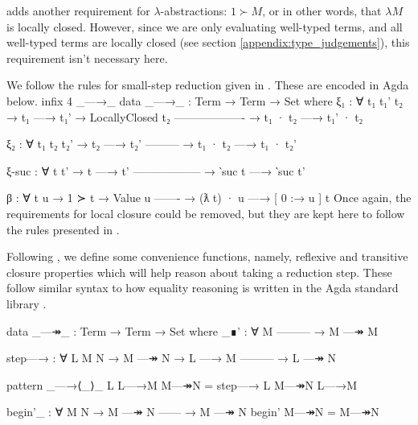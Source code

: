 \documentclass[logo,bsc,singlespacing,parskip,online]{infthesis}
\renewenvironment{code}{\mintedcopy[breaklines,breaksymbolleft=\;]{agda}}{\endmintedcopy}
\begin{document}
\citet{chargueraud_locally_2012} adds another requirement for $\lambda$-abstractions: $1 \succ M$,
or in other words, that $\lambda M$ is locally closed. However, since we are only evaluating
well-typed terms, and all well-typed terms are locally closed (see section
\ref{appendix:type_judgements}), this requirement isn't necessary here.

We follow the rules for small-step reduction given in \citet{chargueraud_locally_2012}. These are
encoded in Agda below.
\begin{code}
  infix 4 _—→_
  data _—→_ : Term → Term → Set where
    ξ₁ : ∀ {t₁ t₁' t₂}
      → t₁ —→ t₁'
      → LocallyClosed t₂
        -------------------
      → t₁ · t₂ —→ t₁' · t₂

    ξ₂ : ∀ {t₁ t₂ t₂'}
      → t₂ —→ t₂'
        ---------
      → t₁ · t₂ —→ t₁ · t₂'

    ξ-suc : ∀ {t t'}
      → t —→ t'
        ------------------
      → ‵suc t —→ ‵suc t'

    β : ∀ {t u}
      → 1 ≻ t
      → Value u
        -------
      → (ƛ t) · u —→ [ 0 :→ u ] t
\end{code}
Once again, the requirements for local closure could be removed, but they are kept here to follow
the rules presented in \citet{chargueraud_locally_2012}.

Following \citet{wadler_programming_2022}, we define some convenience functions, namely, reflexive
and transitive closure properties which will help reason about taking a reduction step. These follow
similar syntax to how equality reasoning is written in the Agda standard library
\citep{the_agda_community_agda_2024}.
\begin{comment}
\begin{code}
  infix  2 _—↠_
  infix  1 begin'_
  infixr 2 _—→⟨_⟩_
  infix  3 _∎'
\end{code}
\end{comment}
\begin{code}
  data _—↠_ : Term → Term → Set where
    _∎' : ∀ M
        ---------
      → M —↠ M

    step—→ : ∀ L {M N}
      → M —↠ N
      → L —→ M
        ---------
      → L —↠ N

  pattern _—→⟨_⟩_ L L—→M M—↠N = step—→ L M—↠N L—→M

  begin'_ : ∀ {M N}
    → M —↠ N
      ------
    → M —↠ N
  begin' M—↠N = M—↠N
\end{code}
\end{document}
